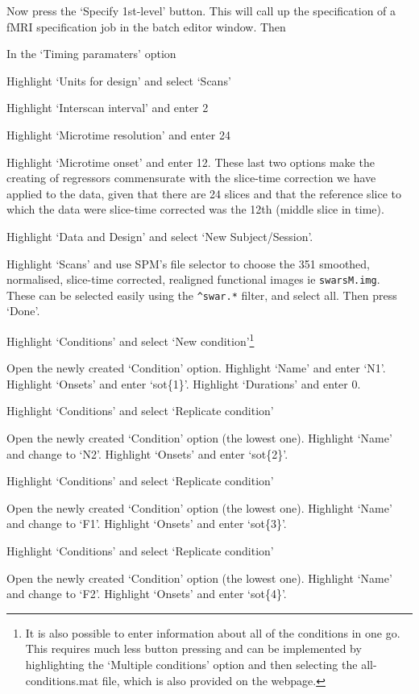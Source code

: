 Now press the `Specify 1st-level' button. This will call up the specification of a fMRI specification job in the batch editor window. Then
\bi
\item{In the `Timing paramaters' option}
\item{Highlight `Units for design' and select `Scans'}
\item{Highlight `Interscan interval' and enter 2}
\item{Highlight `Microtime resolution' and enter 24}
\item{Highlight `Microtime onset' and enter 12. These last two options make the creating of regressors commensurate with the slice-time correction we have applied to the data, given that there are 24 slices and that the reference slice to which the data were slice-time corrected was the 12th (middle slice in time).}
\item{Highlight `Data and Design' and select `New Subject/Session'.}
\item{Highlight `Scans' and use SPM's file selector to 
choose the 351 smoothed, normalised, slice-time corrected, realigned functional images ie  \verb!swarsM.img!. These can be selected 
easily using the \verb!^swar.*! filter, and select all. Then press `Done'.}
\item{Highlight `Conditions' and select `New condition'\footnote{It is also possible to enter information about all of the conditions in one go. This requires much less button pressing and can be implemented by highlighting the `Multiple conditions' option and then selecting the {\sf all-conditions.mat} file, which is also provided on the webpage.}}
\item{Open the newly created `Condition' option. Highlight `Name' and enter `N1'. Highlight `Onsets' and enter `sot\{1\}'. Highlight `Durations' and enter 0.}
\item{Highlight `Conditions' and select `Replicate condition'}
\item{Open the newly created `Condition' option (the lowest one). Highlight `Name' and change to `N2'. Highlight `Onsets' and enter `sot\{2\}'.}
\item{Highlight `Conditions' and select `Replicate condition'}
\item{Open the newly created `Condition' option (the lowest one). Highlight `Name' and change to `F1'. Highlight `Onsets' and enter `sot\{3\}'.}
\item{Highlight `Conditions' and select `Replicate condition'}
\item{Open the newly created `Condition' option (the lowest one). Highlight `Name' and change to `F2'. Highlight `Onsets' and enter `sot\{4\}'.}
